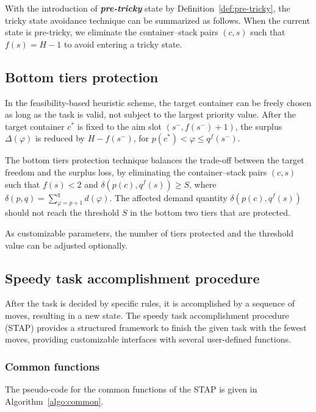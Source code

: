 \documentclass[review,3p,times,12pt,number]{elsarticle}\usepackage{amsmath}\usepackage{amssymb}
\renewcommand{\emph}[1]{\textbf{\textit{#1}}}
\begin{document}
With the introduction of \emph{pre-tricky} state by Definition~\ref{def:pre-tricky}, the tricky state avoidance technique can be summarized as follows. When the current state is pre-tricky, we eliminate the container--stack pairs $(c,s)$ such that $f(s)=H-1$ to avoid entering a tricky state.

\subsection{Bottom tiers protection}

In the feasibility-based heuristic scheme, the target container can be freely chosen as long as the task is valid, not subject to the largest priority value. After the target container $c^*$ is fixed to the aim slot $(s^-,f(s^-)+1)$, the surplus $\Delta(\varphi)$ is reduced by $H-f(s^-)$, for $p(c^*)< \varphi\le q^f(s^-)$.

The bottom tiers protection technique balances the trade-off between the target freedom and the surplus loss, by eliminating the container--stack pairs $(c,s)$ such that $f(s)<2$ and $\delta(p(c),q^f(s))\ge S$, where $\delta(p,q)=\sum_{\varphi=p+1}^{q}d(\varphi)$. The affected demand quantity $\delta(p(c),q^f(s))$ should not reach the threshold $S$ in the bottom two tiers that are protected.

As customizable parameters, the number of tiers protected and the threshold value can be adjusted optionally.

\subsection{Speedy task accomplishment procedure}

\label{sec:speedy}

After the task is decided by specific rules, it is accomplished by a sequence of moves, resulting in a new state. The speedy task accomplishment procedure (STAP) provides a structured framework to finish the given task with the fewest moves, providing customizable interfaces with several user-defined functions.

\subsubsection{Common functions}

The pseudo-code for the common functions of the STAP is given in Algorithm~\ref{algo:common}.
\end{document}

